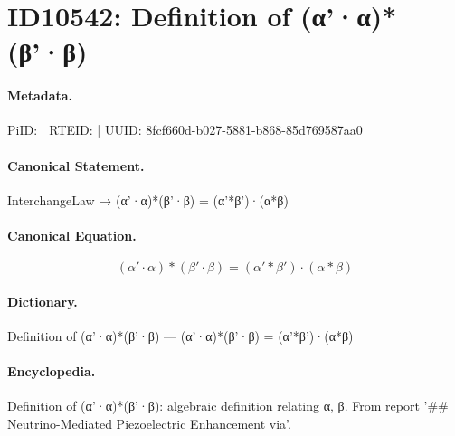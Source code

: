 \section*{ID10542: Definition of (α'·α)*(β'·β)}
\paragraph{Metadata.}
PiID:  | RTEID:  | UUID: 8fcf660d-b027-5881-b868-85d769587aa0

\paragraph{Canonical Statement.}
InterchangeLaw → (α'·α)*(β'·β) = (α'*β')·(α*β)

\paragraph{Canonical Equation.}
\[
(α'·α)*(β'·β) = (α'*β')·(α*β)
\]

\paragraph{Dictionary.}
Definition of (α'·α)*(β'·β) — (α'·α)*(β'·β) = (α'*β')·(α*β)

\paragraph{Encyclopedia.}
Definition of (α'·α)*(β'·β): algebraic definition relating α, β. From report '\#\# Neutrino-Mediated Piezoelectric Enhancement via'.
